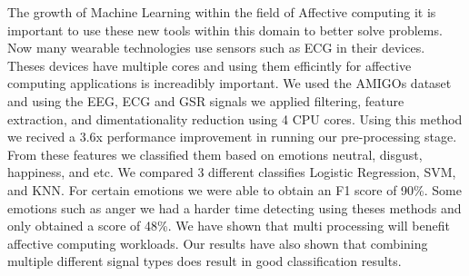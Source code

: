The growth of Machine Learning within the field of
Affective computing it is important to use these new tools within this
domain to better solve problems.
Now many wearable technologies use sensors such as ECG in their devices.
Theses devices have multiple cores and using them efficintly for
affective computing applications is increadibly important.
We used the AMIGOs dataset and using the EEG, ECG and GSR signals
we applied filtering, feature extraction, and dimentationality reduction
using 4 CPU cores.
Using this method we recived a 3.6x performance improvement in running our
pre-processing stage.
From these features we classified them based on emotions
neutral, disgust, happiness, and etc.
We compared 3 different classifies Logistic Regression,
SVM, and KNN.
For certain emotions we were able to obtain an F1 score of 90\%.
Some emotions such as anger we had a harder time detecting
using theses methods and only obtained a score of 48\%.
We have shown that multi processing will benefit affective computing workloads.
Our results have also shown that combining multiple different signal types does
result in good classification results.

